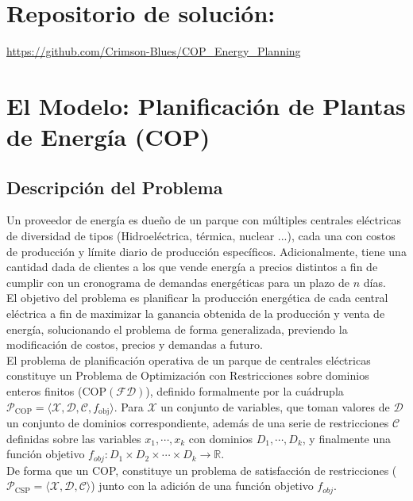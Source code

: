 \section{Repositorio de solución:}
\url{https://github.com/Crimson-Blues/COP_Energy_Planning}

\section{El Modelo: Planificación de Plantas de Energía (COP)}
\label{sec:modelo}
\subsection{Descripción del Problema}

Un proveedor de energía es dueño de un parque con múltiples centrales eléctricas de diversidad de tipos (Hidroeléctrica, térmica, nuclear ...), cada una con costos de producción y límite diario de producción específicos. Adicionalmente, tiene una cantidad dada de clientes a los que vende energía a precios distintos a fin de cumplir con un cronograma de demandas energéticas para un plazo de $n$ días.\\

El objetivo del problema es planificar la producción energética de cada central eléctrica a fin de maximizar la ganancia obtenida de la producción y venta de energía, solucionando el problema de forma generalizada, previendo la modificación de costos, precios y demandas a futuro.\\

El problema de planificación operativa de un parque de centrales eléctricas constituye un Problema de Optimización con Restricciones sobre dominios enteros finitos ($\text{COP}(\mathcal{FD})$), definido formalmente por la cuádrupla $\mathcal{P}_{\text{COP}} = \langle \mathcal{X}, \mathcal{D}, \mathcal{C}, f_{\text{obj}} \rangle$. Para $\mathcal{X}$ un conjunto de variables, que toman valores de $\mathcal{D}$ un conjunto de dominios correspondiente, además de una serie de restricciones $\mathcal{C}$ definidas sobre las variables $x_1,\cdots,x_k$ con dominios $D_1,\cdots,D_k$, y finalmente una función objetivo $f_{obj}:D_1\times D_2\times \cdots \times D_k \to \mathbb{R}$.\\

De forma que un COP, constituye un problema de satisfacción de restricciones ($\mathcal{P}_{\text{CSP}} = \langle \mathcal{X}, \mathcal{D}, \mathcal{C} \rangle$) junto con la adición de una función objetivo $f_{obj}$.\\

